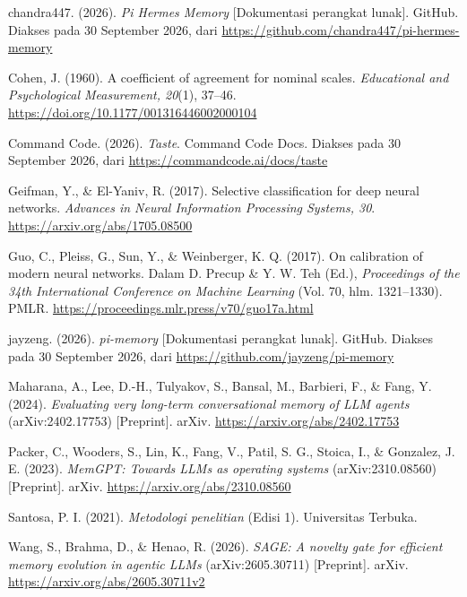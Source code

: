 \documentclass[12pt,a4paper]{article}
\begin{document}
\begin{singlespace}
\raggedright
\begin{list}{}{%
  \setlength{\leftmargin}{1.25cm}%
  \setlength{\itemindent}{-1.25cm}%
  \setlength{\itemsep}{0.8\baselineskip}%
  \setlength{\parsep}{0pt}%
}
\item chandra447. (2026). \textit{Pi Hermes Memory} [Dokumentasi perangkat lunak]. GitHub. Diakses pada 30 September 2026, dari \url{https://github.com/chandra447/pi-hermes-memory}

\item Cohen, J. (1960). A coefficient of agreement for nominal scales. \textit{Educational and Psychological Measurement, 20}(1), 37--46. \url{https://doi.org/10.1177/001316446002000104}

\item Command Code. (2026). \textit{Taste}. Command Code Docs. Diakses pada 30 September 2026, dari \url{https://commandcode.ai/docs/taste}

\item Geifman, Y., \& El-Yaniv, R. (2017). Selective classification for deep neural networks. \textit{Advances in Neural Information Processing Systems, 30}. \url{https://arxiv.org/abs/1705.08500}

\item Guo, C., Pleiss, G., Sun, Y., \& Weinberger, K. Q. (2017). On calibration of modern neural networks. Dalam D. Precup \& Y. W. Teh (Ed.), \textit{Proceedings of the 34th International Conference on Machine Learning} (Vol. 70, hlm. 1321--1330). PMLR. \url{https://proceedings.mlr.press/v70/guo17a.html}

\item jayzeng. (2026). \textit{pi-memory} [Dokumentasi perangkat lunak]. GitHub. Diakses pada 30 September 2026, dari \url{https://github.com/jayzeng/pi-memory}

\item Maharana, A., Lee, D.-H., Tulyakov, S., Bansal, M., Barbieri, F., \& Fang, Y. (2024). \textit{Evaluating very long-term conversational memory of LLM agents} (arXiv:2402.17753) [Preprint]. arXiv. \url{https://arxiv.org/abs/2402.17753}

\item Packer, C., Wooders, S., Lin, K., Fang, V., Patil, S. G., Stoica, I., \& Gonzalez, J. E. (2023). \textit{MemGPT: Towards LLMs as operating systems} (arXiv:2310.08560) [Preprint]. arXiv. \url{https://arxiv.org/abs/2310.08560}

\item Santosa, P. I. (2021). \textit{Metodologi penelitian} (Edisi 1). Universitas Terbuka.
\item Wang, S., Brahma, D., \& Henao, R. (2026). \textit{SAGE: A novelty gate for efficient memory evolution in agentic LLMs} (arXiv:2605.30711) [Preprint]. arXiv. \url{https://arxiv.org/abs/2605.30711v2}


\end{list}
\end{singlespace}
\end{document}
